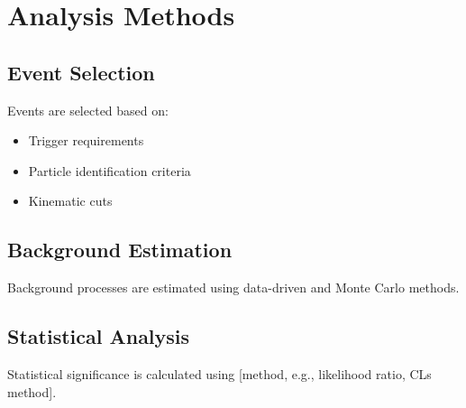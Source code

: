 \section{Analysis Methods}
\label{sec:EXPERIMENT_ANALYSIS_METHODS}

\subsection{Event Selection}
\label{sec:EXPERIMENT_ANALYSIS_METHODS_EVENT_SELECTION}

Events are selected based on:
\begin{itemize}
  \item Trigger requirements
  \item Particle identification criteria
  \item Kinematic cuts
\end{itemize}

\subsection{Background Estimation}
\label{sec:EXPERIMENT_ANALYSIS_METHODS_BACKGROUND_ESTIMATION}

Background processes are estimated using data-driven and Monte Carlo methods.

\subsection{Statistical Analysis}
\label{sec:EXPERIMENT_ANALYSIS_METHODS_STATISTICAL_ANALYSIS}

Statistical significance is calculated using [method, e.g., likelihood ratio, CLs method].

